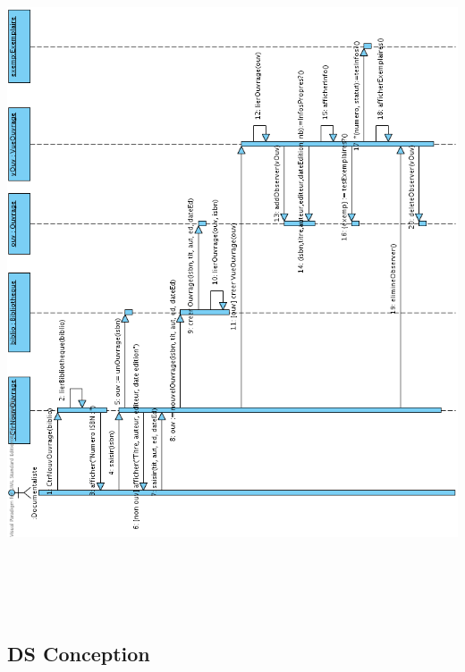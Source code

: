 \documentclass[a4paper,10pt]{report}
\begin{document}
\bigskip
\includegraphics[height=200mm]{NouvOuvMVC.png}
\newpage

\subsection*{DS Conception}
\end{document}
